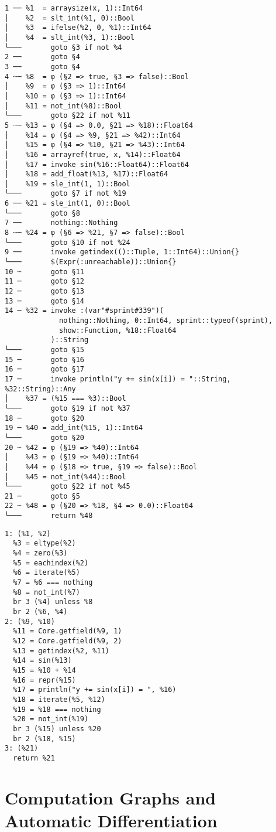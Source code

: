 \begin{lstlisting}
1 ── %1  = arraysize(x, 1)::Int64
│    %2  = slt_int(%1, 0)::Bool
│    %3  = ifelse(%2, 0, %1)::Int64
│    %4  = slt_int(%3, 1)::Bool
└───       goto §3 if not %4
2 ──       goto §4
3 ──       goto §4
4 ┄─ %8  = φ (§2 => true, §3 => false)::Bool
│    %9  = φ (§3 => 1)::Int64
│    %10 = φ (§3 => 1)::Int64
│    %11 = not_int(%8)::Bool
└───       goto §22 if not %11
5 ┄─ %13 = φ (§4 => 0.0, §21 => %18)::Float64
│    %14 = φ (§4 => %9, §21 => %42)::Int64
│    %15 = φ (§4 => %10, §21 => %43)::Int64
│    %16 = arrayref(true, x, %14)::Float64
│    %17 = invoke sin(%16::Float64)::Float64
│    %18 = add_float(%13, %17)::Float64
│    %19 = sle_int(1, 1)::Bool
└───       goto §7 if not %19
6 ── %21 = sle_int(1, 0)::Bool
└───       goto §8
7 ──       nothing::Nothing
8 ┄─ %24 = φ (§6 => %21, §7 => false)::Bool
└───       goto §10 if not %24
9 ──       invoke getindex(()::Tuple, 1::Int64)::Union{}
└───       $(Expr(:unreachable))::Union{}
10 ┄       goto §11
11 ─       goto §12
12 ─       goto §13
13 ─       goto §14
14 ─ %32 = invoke :(var"#sprint#339")(
             nothing::Nothing, 0::Int64, sprint::typeof(sprint), 
             show::Function, %18::Float64
           )::String
└───       goto §15
15 ─       goto §16
16 ─       goto §17
17 ─       invoke println("y += sin(x[i]) = "::String, %32::String)::Any
│    %37 = (%15 === %3)::Bool
└───       goto §19 if not %37
18 ─       goto §20
19 ─ %40 = add_int(%15, 1)::Int64
└───       goto §20
20 ┄ %42 = φ (§19 => %40)::Int64
│    %43 = φ (§19 => %40)::Int64
│    %44 = φ (§18 => true, §19 => false)::Bool
│    %45 = not_int(%44)::Bool
└───       goto §22 if not %45
21 ─       goto §5
22 ┄ %48 = φ (§20 => %18, §4 => 0.0)::Float64
└───       return %48
\end{lstlisting}

\begin{lstlisting}
1: (%1, %2)
  %3 = eltype(%2)
  %4 = zero(%3)
  %5 = eachindex(%2)
  %6 = iterate(%5)
  %7 = %6 === nothing
  %8 = not_int(%7)
  br 3 (%4) unless %8
  br 2 (%6, %4)
2: (%9, %10)
  %11 = Core.getfield(%9, 1)
  %12 = Core.getfield(%9, 2)
  %13 = getindex(%2, %11)
  %14 = sin(%13)
  %15 = %10 + %14
  %16 = repr(%15)
  %17 = println("y += sin(x[i]) = ", %16)
  %18 = iterate(%5, %12)
  %19 = %18 === nothing
  %20 = not_int(%19)
  br 3 (%15) unless %20
  br 2 (%18, %15)
3: (%21)
  return %21
\end{lstlisting}



\textcite{singer2018static}


\section{Computation Graphs and Automatic Differentiation}
\label{sec:graph-track-autom}




